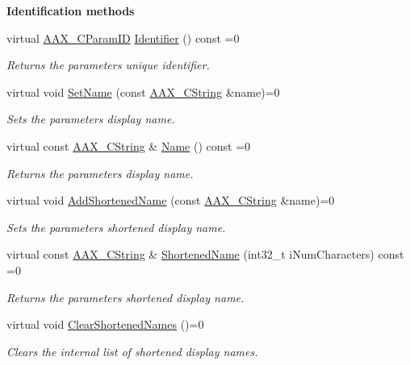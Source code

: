 \begin{Indent}\textbf{ Identification methods}\par
\begin{DoxyCompactItemize}
\item 
virtual \mbox{\hyperlink{a00392_a1440c756fe5cb158b78193b2fc1780d1}{A\+A\+X\+\_\+\+C\+Param\+ID}} \mbox{\hyperlink{a01857_a28807db424a720daa9880ed9ee5d4d21}{Identifier}} () const =0
\begin{DoxyCompactList}\small\item\em Returns the parameter\textquotesingle{}s unique identifier. \end{DoxyCompactList}\item 
virtual void \mbox{\hyperlink{a01857_a480e9947cdaee6f26ca2bbaeb9de56b2}{Set\+Name}} (const \mbox{\hyperlink{a01573}{A\+A\+X\+\_\+\+C\+String}} \&name)=0
\begin{DoxyCompactList}\small\item\em Sets the parameter\textquotesingle{}s display name. \end{DoxyCompactList}\item 
virtual const \mbox{\hyperlink{a01573}{A\+A\+X\+\_\+\+C\+String}} \& \mbox{\hyperlink{a01857_ae1dae8844a16492726cb6caac7e2e822}{Name}} () const =0
\begin{DoxyCompactList}\small\item\em Returns the parameter\textquotesingle{}s display name. \end{DoxyCompactList}\item 
virtual void \mbox{\hyperlink{a01857_a642ce0054e136c75fe402ebd53a4eb90}{Add\+Shortened\+Name}} (const \mbox{\hyperlink{a01573}{A\+A\+X\+\_\+\+C\+String}} \&name)=0
\begin{DoxyCompactList}\small\item\em Sets the parameter\textquotesingle{}s shortened display name. \end{DoxyCompactList}\item 
virtual const \mbox{\hyperlink{a01573}{A\+A\+X\+\_\+\+C\+String}} \& \mbox{\hyperlink{a01857_a729ead00bf12103793557f39a01f782c}{Shortened\+Name}} (int32\+\_\+t i\+Num\+Characters) const =0
\begin{DoxyCompactList}\small\item\em Returns the parameter\textquotesingle{}s shortened display name. \end{DoxyCompactList}\item 
virtual void \mbox{\hyperlink{a01857_ae8601be6754169f626269f81f38b4581}{Clear\+Shortened\+Names}} ()=0
\begin{DoxyCompactList}\small\item\em Clears the internal list of shortened display names. \end{DoxyCompactList}\end{DoxyCompactItemize}
\end{Indent}

